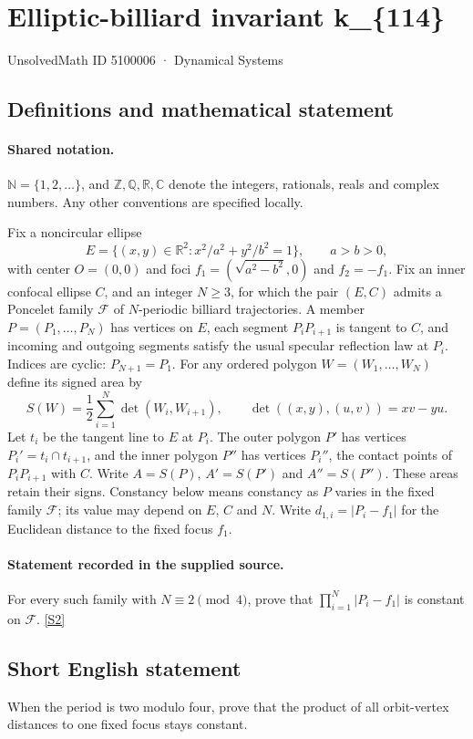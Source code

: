 \documentclass[11pt]{article}
\newcommand{\sref}[2]{\hyperlink{source:#1:#2}{[S#2]}}
\begin{document}
\setcounter{section}{5100005}
\section{Elliptic-billiard invariant k\_\{114\}}\label{5100006}
{\small\sffamily UnsolvedMath ID 5100006 · Dynamical Systems}
\subsection{Definitions and mathematical statement}

\paragraph{Shared notation.}$\mathbb N=\{1,2,\ldots\}$, and $\mathbb Z,\mathbb Q,\mathbb R,\mathbb C$ denote the integers, rationals, reals and complex numbers. Any other conventions are specified locally.


Fix a noncircular ellipse
\[
E=\{(x,y)\in\mathbb R^2:x^2/a^2+y^2/b^2=1\},\qquad a>b>0,
\]
with center $O=(0,0)$ and foci $f_1=(\sqrt{a^2-b^2},0)$ and $f_2=-f_1$. Fix an inner confocal ellipse $C$, and an integer $N\geq3$, for which the pair $(E,C)$ admits a Poncelet family $\mathcal F$ of $N$-periodic billiard trajectories. A member $P=(P_1,\ldots,P_N)$ has vertices on $E$, each segment $P_iP_{i+1}$ is tangent to $C$, and incoming and outgoing segments satisfy the usual specular reflection law at $P_i$. Indices are cyclic: $P_{N+1}=P_1$.
For any ordered polygon $W=(W_1,\ldots,W_N)$ define its signed area by
\[
S(W)=\frac12\sum_{i=1}^N\det(W_i,W_{i+1}),\qquad
\det((x,y),(u,v))=xv-yu.
\]
Let $t_i$ be the tangent line to $E$ at $P_i$. The outer polygon $P'$ has vertices $P_i'=t_i\cap t_{i+1}$, and the inner polygon $P''$ has vertices $P_i''$, the contact points of $P_iP_{i+1}$ with $C$. Write $A=S(P)$, $A'=S(P')$ and $A''=S(P'')$. These areas retain their signs. Constancy below means constancy as $P$ varies in the fixed family $\mathcal F$; its value may depend on $E$, $C$ and $N$.
Write $d_{1,i}=|P_i-f_1|$ for the Euclidean distance to the fixed focus $f_1$.
\paragraph{Statement recorded in the supplied source.}
For every such family with $N\equiv2\pmod4$, prove that $\displaystyle\prod_{i=1}^N|P_i-f_1|$ is constant on $\mathcal F$. \sref{5100006}{2}
\subsection{Short English statement}
When the period is two modulo four, prove that the product of all orbit-vertex distances to one fixed focus stays constant.
\end{document}
